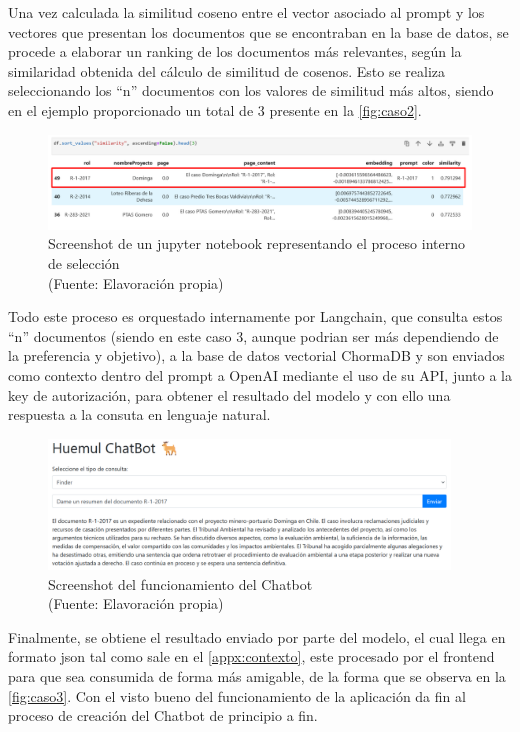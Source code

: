 Una vez calculada la similitud coseno entre el vector asociado al prompt y los vectores que presentan los documentos que se encontraban en la 
base de datos, se procede a elaborar un ranking de los documentos más relevantes, según la similaridad obtenida del cálculo de similitud de cosenos. 
Esto se realiza seleccionando los ``n'' documentos con los valores de similitud más altos, siendo en el ejemplo proporcionado un total de 3 
presente en la \autoref{fig:caso2}.

\begin{figure}[ht!]
    \centering
    \includegraphics[width=1\textwidth]{figures/embedding2.png}
    \caption[Screenshot de un jupyter notebook representando el proceso interno de selección]{Screenshot de un jupyter notebook representando el proceso interno de selección\\
    {\scriptsize (Fuente: Elavoración propia)}}
    \label{fig:caso2}
\end{figure}

\newpage

Todo este proceso es orquestado internamente por Langchain, que consulta estos ``n'' documentos (siendo en este caso 3, aunque podrian ser 
más dependiendo de la preferencia y objetivo), a la base de datos vectorial
ChormaDB y son enviados como contexto dentro del prompt a OpenAI mediante el uso de su API, junto a la key de autorización, 
para obtener el resultado del modelo y con ello una respuesta a la consuta en lenguaje natural.



\begin{figure}[ht!]
    \centering
    \includegraphics[width=0.95\textwidth]{figures/website2.png}
    \caption[Screenshot del funcionamiento del Chatbot]{Screenshot del funcionamiento del Chatbot\\
    {\scriptsize (Fuente: Elavoración propia)}}
    \label{fig:caso3}
\end{figure}

Finalmente, se obtiene el resultado enviado por parte del modelo, el cual llega en formato json tal como sale en el \autoref{appx:contexto},
este procesado por el frontend para que sea consumida de forma más amigable, de la forma que se observa en la \autoref{fig:caso3}.
Con el visto bueno del funcionamiento de la aplicación da fin al proceso de creación del Chatbot de principio a fin.
